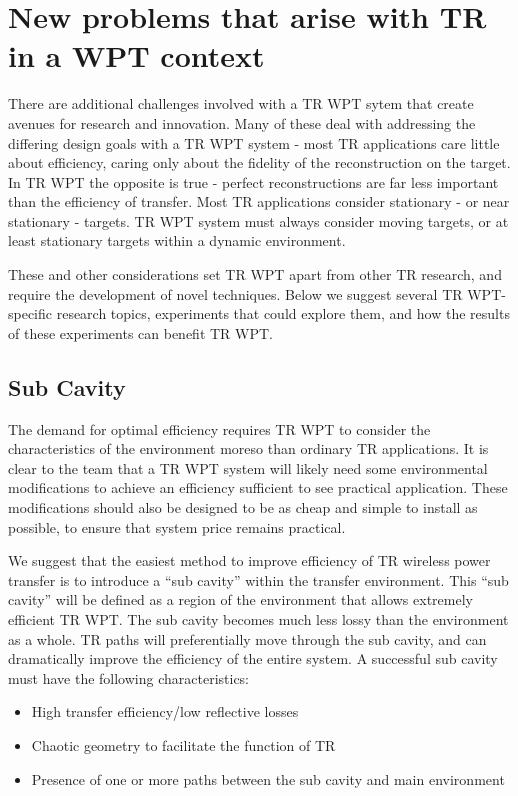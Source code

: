 \section{New problems that arise with TR in a WPT context}
\label{sec:future-wpt}

There are additional challenges involved with a TR WPT sytem that create avenues for research and innovation. Many of these deal with addressing the differing design goals with a TR WPT system - most TR applications care little about efficiency, caring only about the fidelity of the reconstruction on the target. In TR WPT the opposite is true - perfect reconstructions are far less important than the efficiency of transfer. Most TR applications consider stationary - or near stationary - targets. TR WPT system must always consider moving targets, or at least stationary targets within a dynamic environment.

These and other considerations set TR WPT apart from other TR research, and require the development of novel techniques. Below we suggest several TR WPT-specific research topics, experiments that could explore them, and how the results of these experiments can benefit TR WPT.

\subsection{Sub Cavity}

The demand for optimal efficiency requires TR WPT to consider the characteristics of the environment moreso than ordinary TR applications. It is clear to the team that a TR WPT system will likely need some environmental modifications to achieve an efficiency sufficient to see practical application. These modifications should also be designed to be as cheap and simple to install as possible, to ensure that system price remains practical.

We suggest that the easiest method to improve efficiency of TR wireless power transfer is to introduce a ``sub cavity'' within the transfer environment. This ``sub cavity'' will be defined as a region of the environment that allows extremely efficient TR WPT. The sub cavity becomes much less lossy than the environment as a whole. TR paths will preferentially move through the sub cavity, and can dramatically improve the efficiency of the entire system. A successful sub cavity must have the following characteristics:

\begin{itemize}
  \item High transfer efficiency/low reflective losses
  \item Chaotic geometry to facilitate the function of TR
  \item Presence of one or more paths between the sub cavity and main environment
\end{itemize}

